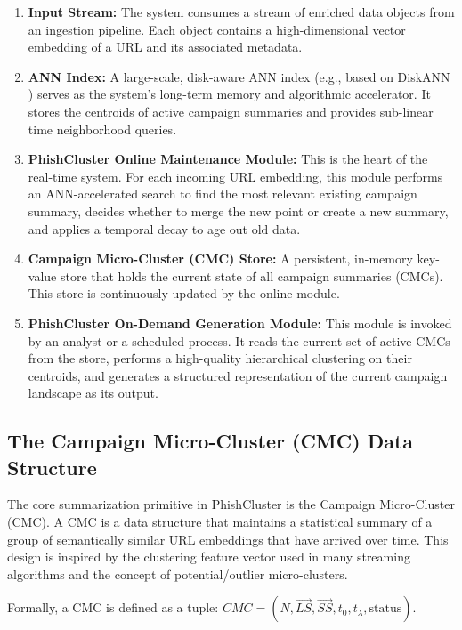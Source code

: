 \documentclass[journal,article,submit,pdftex,moreauthors]{Definitions/mdpi}
\begin{document}
\begin{enumerate}
    \item \textbf{Input Stream:} The system consumes a stream of enriched data objects from an ingestion pipeline. Each object contains a high-dimensional vector embedding of a URL and its associated metadata.
    \item \textbf{ANN Index:} A large-scale, disk-aware ANN index (e.g., based on DiskANN \cite{ref_subramanya}) serves as the system's long-term memory and algorithmic accelerator. It stores the centroids of active campaign summaries and provides sub-linear time neighborhood queries.
    \item \textbf{PhishCluster Online Maintenance Module:} This is the heart of the real-time system. For each incoming URL embedding, this module performs an ANN-accelerated search to find the most relevant existing campaign summary, decides whether to merge the new point or create a new summary, and applies a temporal decay to age out old data.
    \item \textbf{Campaign Micro-Cluster (CMC) Store:} A persistent, in-memory key-value store that holds the current state of all campaign summaries (CMCs). This store is continuously updated by the online module.
    \item \textbf{PhishCluster On-Demand Generation Module:} This module is invoked by an analyst or a scheduled process. It reads the current set of active CMCs from the store, performs a high-quality hierarchical clustering on their centroids, and generates a structured representation of the current campaign landscape as its output.
\end{enumerate}

\subsection{The Campaign Micro-Cluster (CMC) Data Structure}

The core summarization primitive in PhishCluster is the Campaign Micro-Cluster (CMC). A CMC is a data structure that maintains a statistical summary of a group of semantically similar URL embeddings that have arrived over time. This design is inspired by the clustering feature vector used in many streaming algorithms and the concept of potential/outlier micro-clusters.

Formally, a CMC is defined as a tuple: $CMC = (N, \vec{LS}, \vec{SS}, t_0, t_\lambda, \text{status})$.
\end{document}
